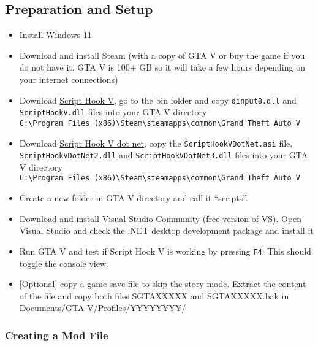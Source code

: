 \documentclass[
  openany]{book}
\begin{document}
\hypertarget{preparation-and-setup}{%
\subsection*{Preparation and Setup}\label{preparation-and-setup}}

\begin{itemize}
\item
  Install Windows 11
\item
  Download and install \href{https://store.steampowered.com/about/}{Steam} (with a copy of GTA V or buy the game if you do not have it. GTA V is 100+ GB so it will take a few hours depending on your internet connections)
\item
  Download \href{https://www.gta5-mods.com/tools/script-hook-v}{Script Hook V}, go to the bin folder and copy \texttt{dinput8.dll} and \texttt{ScriptHookV.dll} files into your GTA V directory \texttt{C:\textbackslash{}Program\ Files\ (x86)\textbackslash{}Steam\textbackslash{}steamapps\textbackslash{}common\textbackslash{}Grand\ Theft\ Auto\ V}
\item
  Download \href{https://github.com/crosire/scripthookvdotnet/releases}{Script Hook V dot net}, copy the \texttt{ScriptHookVDotNet.asi} file, \texttt{ScriptHookVDotNet2.dll} and \texttt{ScriptHookVDotNet3.dll} files into your GTA V directory \texttt{C:\textbackslash{}Program\ Files\ (x86)\textbackslash{}Steam\textbackslash{}steamapps\textbackslash{}common\textbackslash{}Grand\ Theft\ Auto\ V}
\item
  Create a new folder in GTA V directory and call it ``scripts''.
\item
  Download and install \href{https://visualstudio.microsoft.com/vs/community/}{Visual Studio Community} (free version of VS). Open Visual Studio and check the .NET desktop development package and install it
\item
  Run GTA V and test if Script Hook V is working by pressing \texttt{F4}. This should toggle the console view.
\item
  {[}Optional{]} copy a \href{https://www.gta5-mods.com/misc/100-save-game}{game save file} to skip the story mode. Extract the content of the file and copy both files SGTAXXXXX and SGTAXXXXX.bak in Documents/GTA V/Profiles/YYYYYYYY/
\end{itemize}

\hypertarget{creating-a-mod-file}{%
\subsubsection*{Creating a Mod File}\label{creating-a-mod-file}}
\end{document}
